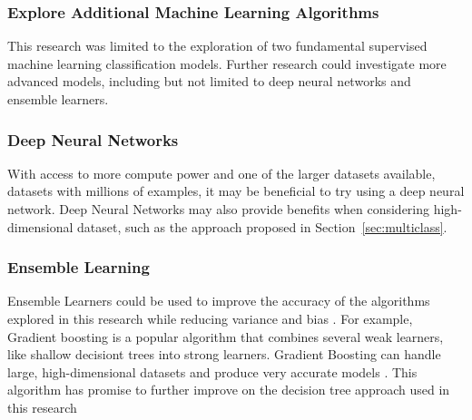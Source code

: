 \documentclass[12pt]{article}
\begin{document}
\subsubsection{Explore Additional Machine Learning Algorithms}
This research was limited to the exploration of two fundamental supervised machine learning classification models. Further research could investigate more advanced models, including but not limited to deep neural networks and ensemble learners.

\subsubsection{Deep Neural Networks}
With access to more compute power and one of the larger datasets available, datasets with millions of examples, it may be beneficial to try using a deep neural network. Deep Neural Networks may also provide benefits when considering high-dimensional dataset, such as the approach proposed in Section~\ref{sec:multiclass}.

\subsubsection{Ensemble Learning}
Ensemble Learners could be used to improve the accuracy of the algorithms explored in this research while reducing variance and bias \cite[Chapter 7, Section 7.5]{100MLB}. For example, Gradient boosting is a popular algorithm that combines several weak learners, like shallow decisiont trees into strong learners. Gradient Boosting can handle large, high-dimensional datasets and produce very accurate models \cite{greeksGeeksGB}. This algorithm has promise to further improve on the decision tree approach used in this research

\newpage

\end{document}
